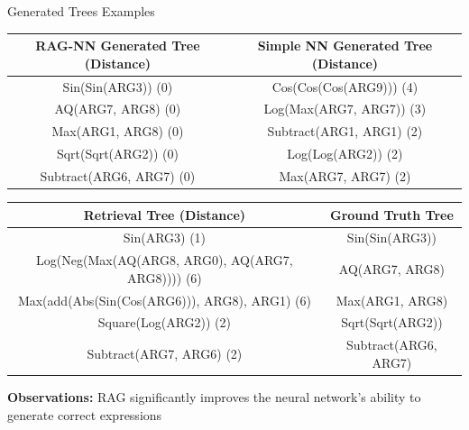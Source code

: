 \documentclass[aspectratio=1610]{beamer}
\begin{document}
    \begin{frame}{Generated Trees Examples}
        \begin{table}
            \centering
            \footnotesize
            \begin{tabular}{cc}
                \toprule
                RAG-NN Generated Tree (Distance) & Simple NN Generated Tree (Distance) \\
                \midrule
                Sin(Sin(ARG3)) (0)               & Cos(Cos(Cos(ARG9))) (4)             \\
                AQ(ARG7, ARG8) (0)               & Log(Max(ARG7, ARG7)) (3)            \\
                Max(ARG1, ARG8) (0)              & Subtract(ARG1, ARG1) (2)            \\
                Sqrt(Sqrt(ARG2)) (0)             & Log(Log(ARG2)) (2)                  \\
                Subtract(ARG6, ARG7) (0)         & Max(ARG7, ARG7) (2)                 \\
                \bottomrule
            \end{tabular}
        \end{table}

        \begin{table}
            \centering
            \footnotesize
            \begin{tabular}{cc}
                \toprule
                Retrieval Tree (Distance)                         & Ground Truth Tree    \\
                \midrule
                Sin(ARG3) (1)                                     & Sin(Sin(ARG3))       \\
                Log(Neg(Max(AQ(ARG8, ARG0), AQ(ARG7, ARG8)))) (6) & AQ(ARG7, ARG8)       \\
                Max(add(Abs(Sin(Cos(ARG6))), ARG8), ARG1) (6)     & Max(ARG1, ARG8)      \\
                Square(Log(ARG2)) (2)                             & Sqrt(Sqrt(ARG2))     \\
                Subtract(ARG7, ARG6) (2)                          & Subtract(ARG6, ARG7) \\
                \bottomrule
            \end{tabular}
        \end{table}

        \textbf{Observations:} RAG significantly improves the neural network's ability to generate correct expressions
    \end{frame}
\end{document}
